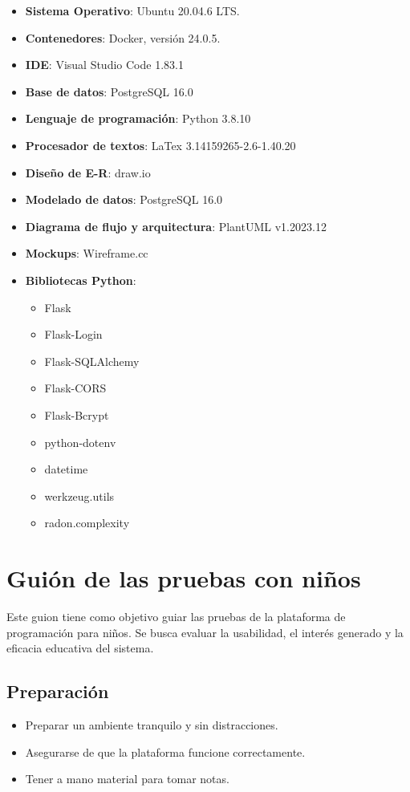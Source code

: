 \begin{appendices}
\begin{itemize}
    \item \textbf{Sistema Operativo}: Ubuntu 20.04.6 LTS.
    \item \textbf{Contenedores}: Docker, versión 24.0.5.
    \item \textbf{IDE}: Visual Studio Code 1.83.1
    \item \textbf{Base de datos}: PostgreSQL 16.0
    \item \textbf{Lenguaje de programación}: Python 3.8.10
    \item \textbf{Procesador de textos}: LaTex 3.14159265-2.6-1.40.20
    \item \textbf{Diseño de E-R}: draw.io
    \item \textbf{Modelado de datos}: PostgreSQL 16.0
    \item \textbf{Diagrama de flujo y arquitectura}: PlantUML v1.2023.12
    \item \textbf{Mockups}: Wireframe.cc
    \item \textbf{Bibliotecas Python}:
    \begin{itemize}
        \item Flask \cite{flask}
        \item Flask-Login \cite{flask-login}
        \item Flask-SQLAlchemy \cite{flask-sqlalchemy}
        \item Flask-CORS \cite{flask-cors}
        \item Flask-Bcrypt \cite{flask-bcrypt}
        \item python-dotenv \cite{python-dotenv}
        \item datetime \cite{datetime}
        \item werkzeug.utils \cite{werkzeug}
        \item radon.complexity \cite{radon}
    \end{itemize}
\end{itemize}
    
\chapter{Guión de las pruebas con niños}

Este guion tiene como objetivo guiar las pruebas de la plataforma de programación para niños. Se busca evaluar la usabilidad, el interés generado y la eficacia educativa del sistema.

\section{Preparación}
\begin{itemize}
    \item Preparar un ambiente tranquilo y sin distracciones.
    \item Asegurarse de que la plataforma funcione correctamente.
    \item Tener a mano material para tomar notas.
\end{itemize}


\end{appendices}
